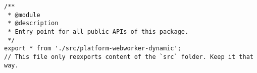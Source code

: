 \begin{verbatim}
/**
 * @module
 * @description
 * Entry point for all public APIs of this package.
 */
export * from './src/platform-webworker-dynamic';
// This file only reexports content of the `src` folder. Keep it that way.
\end{verbatim}
